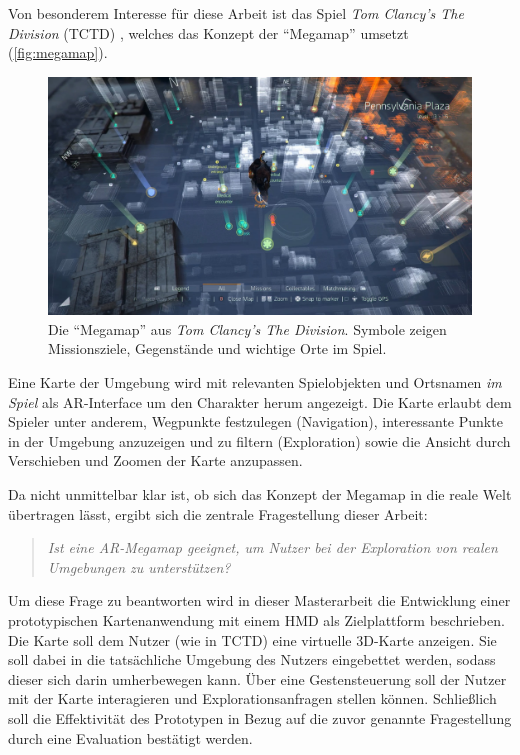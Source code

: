 Von besonderem Interesse für diese Arbeit ist das Spiel \emph{Tom Clancy's The Division} (TCTD) \parencite{Ubisoft2018}, welches das Konzept der \enquote{Megamap} umsetzt (\autoref{fig:megamap}).
\begin{figure}
    \centering
    \includegraphics[width=\textwidth]{figures/the_division_megamap.jpg}
    \caption{Die \enquote{Megamap} aus \emph{Tom Clancy's The Division}. Symbole zeigen Missionsziele, Gegenstände und wichtige Orte im Spiel.}
    \label{fig:megamap}
\end{figure}
Eine Karte der Umgebung wird mit relevanten Spielobjekten und Ortsnamen \emph{im Spiel} als AR-Interface um den Charakter herum angezeigt.
Die Karte erlaubt dem Spieler unter anderem, Wegpunkte festzulegen (Navigation), interessante Punkte in der Umgebung anzuzeigen und zu filtern (Exploration) sowie die Ansicht durch Verschieben und Zoomen der Karte anzupassen.

Da nicht unmittelbar klar ist, ob sich das Konzept der Megamap in die reale Welt übertragen lässt, ergibt sich die zentrale Fragestellung dieser Arbeit:
\begin{quote}
\itshape
Ist eine AR-Megamap geeignet, um Nutzer bei der Exploration von \emph{realen} Umgebungen zu unterstützen?
\end{quote}
Um diese Frage zu beantworten wird in dieser Masterarbeit die Entwicklung einer prototypischen Kartenanwendung mit einem HMD als Zielplattform beschrieben.
Die Karte soll dem Nutzer (wie in TCTD) eine virtuelle 3D-Karte anzeigen.
Sie soll dabei in die tatsächliche Umgebung des Nutzers eingebettet werden, sodass dieser sich darin umherbewegen kann.
Über eine Gestensteuerung soll der Nutzer mit der Karte interagieren und Explorationsanfragen stellen können.
Schließlich soll die Effektivität des Prototypen in Bezug auf die zuvor genannte Fragestellung durch eine Evaluation bestätigt werden.

